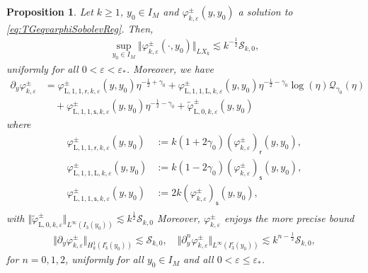 \documentclass[11pt,reqno]{amsproc}
\newtheorem{proposition}{Proposition}[section]
\theoremstyle{definition}
\numberwithin{equation}{section}
\newcommand{\rL}{{\mathrm{L}}}
\newcommand{\Q}{{\mathcal{Q}}}
\newcommand{\sr}{{\mathsf{r}}}
\newcommand{\s}{{\mathsf{s}}}
\newcommand{\cS}{{\mathcal S}}
\newcommand{\ep}{\varepsilon}
\begin{document}
\begin{proposition}\label{prop:LXkvarphi}
Let $k\geq 1$, $y_0\in I_M$ and $\varphi_{k,\ep}^\pm(y,y_0)$ a solution to \eqref{eq:TGeqvarphiSobolevReg}. Then,
\begin{align*}
\sup_{y_0\in I_M}\Vert \varphi_{k,\ep}^\pm(\cdot,y_0) \Vert_{LX_k} \lesssim k^{-\frac12}\cS_{k,0}, 
\end{align*}
uniformly for all $0 < \ep< \ep_*$. Moreover, we have
\begin{equation}\label{eq:decomLXkpyvarphi}
\begin{split}
\partial_{y}\varphi_{k,\ep}^\pm &= \varphi_{\rL,1,1,\sr,k,\ep}^\pm(y,y_0) \eta^{-\frac12+\gamma_0} + \varphi_{\rL,1,1,\rL,k,\ep}^\pm(y,y_0) \eta^{-\frac12-\gamma_0}\log(\eta) \Q_{\gamma_0}(\eta) \\
&\quad +\varphi_{\rL,1,1,\s,k,\ep}^\pm(y,y_0) \eta^{-\frac12-\gamma_0} + \widetilde\varphi_{\rL,0,k,\ep}^\pm(y,y_0)
\end{split}
\end{equation}
where
\begin{align*}
\varphi_{\rL,1,1,\sr,k,\ep}^\pm(y,y_0) &:= k(1+2\gamma_0)\left( \varphi_{k,\ep}^\pm \right)_\sr(y,y_0), \\ 
\varphi_{\rL,1,1,\rL,k,\ep}^\pm(y,y_0) &:= k(1-2\gamma_0)\left( \varphi_{k,\ep}^\pm \right)_\s(y,y_0), \\ 
\varphi_{\rL,1,1,\s,k,\ep}^\pm(y,y_0) &:= 2k\left( \varphi_{k,\ep}^\pm \right)_\s(y,y_0), \\ 
\end{align*}
with $\Vert \widetilde\varphi_{\rL,0,k,\ep}^\pm \Vert_{L^\infty(I_3(y_0))} \lesssim k^{\frac12}\cS_{k,0}$
Moreover, $\varphi_{k,\ep}^\pm$ enjoys the more precise bound
\begin{align*}
\Vert \partial_{y}\varphi_{k,\ep}^\pm \Vert_{H_k^1(I_3^c(y_0))} \lesssim  \cS_{k,0}, \quad \Vert \partial_{y}^n\varphi_{k,\ep}^\pm \Vert_{L^\infty(I_3^c(y_0))} \lesssim k^{n-\frac12}\cS_{k,0}, 
\end{align*}
for $n=0,1,2$, uniformly for all $y_0\in I_M$ and all $0 < \ep\leq \ep_*$.
\end{proposition}
\end{document}
